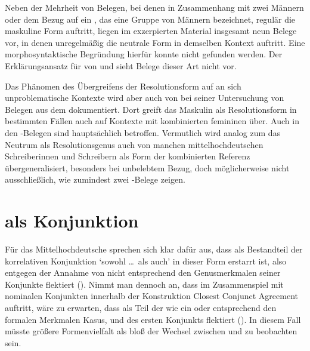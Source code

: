 Neben der Mehrheit von Belegen, bei denen in Zusammenhang mit zwei Männern oder
dem Bezug auf ein , das eine Gruppe von Männern bezeichnet,
regulär die maskuline Form  auftritt, liegen im exzerpierten
Material insgesamt neun Belege vor, in denen unregelmäßig die
neutrale Form  in demselben Kontext auftritt. Eine
morphosyntaktische Begründung hierfür konnte nicht gefunden werden. Der
Erklärungsansatz für  von \citet{wechslerzlatic2003} und
\citet{wechsler2009} sieht Belege dieser Art nicht vor.

Das Phänomen des Übergreifens der Resolutionsform auf an sich unproblematische
Kontexte wird aber auch von \citet[302]{corbett1991} bei seiner Untersuchung
von Belegen aus dem  dokumentiert. Dort greift das Maskulin als
Resolutionsform in bestimmten Fällen auch auf Kon\-texte mit kombinierten
femininen  über. Auch in den \CAO{}-Belegen sind hauptsächlich
 betroffen. Vermutlich wird analog zum  das Neutrum
als Resolutionsgenus auch von manchen
mittelhochdeutschen Schreiberinnen und Schreibern als
Form der kombinierten Referenz übergeneralisiert, besonders
bei unbelebtem Bezug, doch möglicherweise nicht ausschließlich,
wie zumindest zwei \KC-Belege zeigen.


\section{ als Konjunktion}
\label{sec:beideconj}

Für das Mittelhochdeutsche sprechen sich
\citet[626--627]{ksw2} klar dafür aus, dass  als Bestandteil der
korrelativen Konjunktion  `sowohl \dots\ als auch' in
dieser Form erstarrt ist, also  entgegen der Annahme von
\citet{askedal1974} nicht entsprechend den Genusmerkmalen
seiner Konjunkte flektiert (). Nimmt man dennoch an,
dass im Zusammenspiel mit nominalen Konjunkten innerhalb der Konstruktion
Closest Conjunct Agreement auftritt, wäre zu
erwarten, dass  als Teil der  wie ein
 oder  entsprechend den formalen
Merkmalen Kasus,  und  des
ersten Konjunkts flektiert (). In diesem Fall müsste
größere Formenvielfalt als bloß der Wechsel zwischen  und
 zu beobachten sein.

